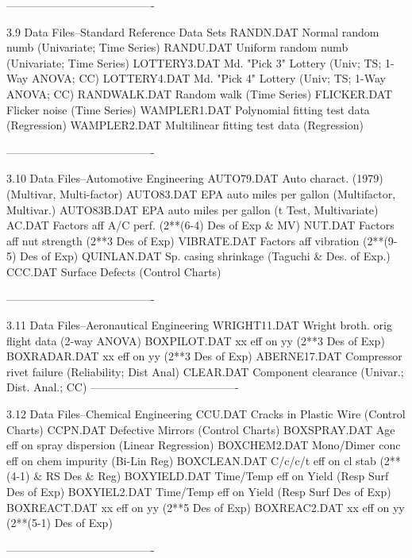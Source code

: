 ----------------------------------------
 
3.9
Data Files--Standard Reference Data Sets
      RANDN.DAT     Normal random numb (Univariate; Time Series)
      RANDU.DAT     Uniform random numb (Univariate; Time Series)
      LOTTERY3.DAT  Md. "Pick 3" Lottery (Univ; TS; 1-Way ANOVA; CC)
      LOTTERY4.DAT  Md. "Pick 4" Lottery (Univ; TS; 1-Way ANOVA; CC)
      RANDWALK.DAT  Random walk (Time Series)
      FLICKER.DAT   Flicker noise (Time Series)
      WAMPLER1.DAT  Polynomial fitting test data (Regression)
      WAMPLER2.DAT  Multilinear fitting test data (Regression)
 
----------------------------------------
 
3.10
Data Files--Automotive Engineering
      AUTO79.DAT    Auto charact. (1979) (Multivar, Multi-factor)
      AUTO83.DAT    EPA auto miles per gallon (Multifactor, Multivar.)
      AUTO83B.DAT   EPA auto miles per gallon (t Test, Multivariate)
      AC.DAT        Factors aff A/C perf. (2**(6-4) Des of Exp & MV)
      NUT.DAT       Factors aff nut strength (2**3 Des of Exp)
      VIBRATE.DAT   Factors aff vibration (2**(9-5) Des of Exp)
      QUINLAN.DAT   Sp. casing shrinkage (Taguchi & Des. of Exp.)
      CCC.DAT       Surface Defects (Control Charts)
 
----------------------------------------
 
3.11
Data Files--Aeronautical Engineering
      WRIGHT11.DAT  Wright broth. orig flight data (2-way ANOVA)
      BOXPILOT.DAT  xx eff on yy (2**3 Des of Exp)
      BOXRADAR.DAT  xx eff on yy (2**3 Des of Exp)
      ABERNE17.DAT  Compressor rivet failure (Reliability; Dist Anal)
      CLEAR.DAT     Component clearance (Univar.; Dist. Anal.; CC)
----------------------------------------
 
3.12
Data Files--Chemical Engineering
      CCU.DAT       Cracks in Plastic Wire (Control Charts)
      CCPN.DAT      Defective Mirrors (Control Charts)
      BOXSPRAY.DAT  Age eff on spray dispersion (Linear Regression)
      BOXCHEM2.DAT  Mono/Dimer conc eff on chem impurity (Bi-Lin Reg)
      BOXCLEAN.DAT  C/c/c/t eff on cl stab (2**(4-1) & RS Des & Reg)
      BOXYIELD.DAT  Time/Temp eff on Yield (Resp Surf Des of Exp)
      BOXYIEL2.DAT  Time/Temp eff on Yield (Resp Surf Des of Exp)
      BOXREACT.DAT  xx eff on yy (2**5 Des of Exp)
      BOXREAC2.DAT  xx eff on yy (2**(5-1) Des of Exp)
 
----------------------------------------
 
